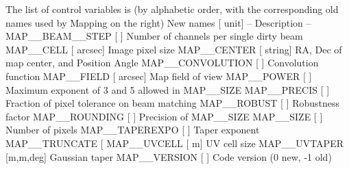 The  list  of control variables is (by alphabetic order, with the
corresponding old names used by Mapping on the right)
New names       [   unit]       -- Description --    %
MAP__BEAM__STEP   [       ]  Number of channels per single dirty beam
MAP__CELL        [ arcsec]  Image pixel size
MAP__CENTER      [ string]  RA, Dec of map center, and Position Angle
MAP__CONVOLUTION [       ]  Convolution function     %
MAP__FIELD       [ arcsec]  Map field of view
MAP__POWER       [       ]  Maximum exponent of 3 and 5 allowed in MAP__SIZE
MAP__PRECIS      [       ]  Fraction of pixel tolerance on beam matching
MAP__ROBUST      [       ]  Robustness factor        %
MAP__ROUNDING    [       ]  Precision of MAP__SIZE
MAP__SIZE        [       ]  Number of pixels
MAP__TAPEREXPO   [       ]  Taper exponent           %
MAP__TRUNCATE    [      %
MAP__UVCELL      [      m]  UV cell size             %
MAP__UVTAPER     [m,m,deg]  Gaussian taper           %
MAP__VERSION     [       ]  Code version (0 new, -1 old)
